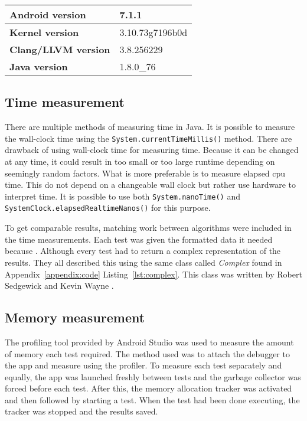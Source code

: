 \begin{table}[H]
    \centering
    \begin{tabular}{|l|l|}
        \hline
        \textbf{Android version} & 7.1.1\\
        \hline
        \textbf{Kernel version} & 3.10.73g7196b0d\\
        \hline
        \textbf{Clang/LLVM version} & 3.8.256229\\
        \hline
        \textbf{Java version} & 1.8.0\_76\\
        \hline
    \end{tabular}
\end{table}


\subsection{Time measurement}
There are multiple methods of measuring time in Java. It is possible to measure the wall-clock time using the \texttt{System.currentTimeMillis()} method. There are drawback of using wall-clock time for measuring time. Because it can be changed at any time, it could result in too small or too large runtime depending on seemingly random factors. What is more preferable is to measure elapsed cpu time. This do not depend on a changeable wall clock but rather use hardware to interpret time. It is possible to use both \texttt{System.nanoTime()} and \texttt{SystemClock.elapsedRealtimeNanos()} for this purpose.

To get comparable results, matching work between algorithms were included in the time measurements. Each test was given the formatted data it needed because . Although every test had to return a complex representation of the results. They all described this using the same class called \emph{Complex} found in Appendix~\ref{appendix:code} Listing~\ref{lst:complex}. This class was written by Robert Sedgewick and Kevin Wayne \cite{princeton:complex}.

\subsection{Memory measurement}
The profiling tool provided by Android Studio was used to measure the amount of memory each test required. The method used was to attach the debugger to the app and measure using the profiler. To measure each test separately and equally, the app was launched freshly between tests and the garbage collector was forced before each test. After this, the memory allocation tracker was activated and then followed by starting a test. When the test had been done executing, the tracker was stopped and the results saved.

